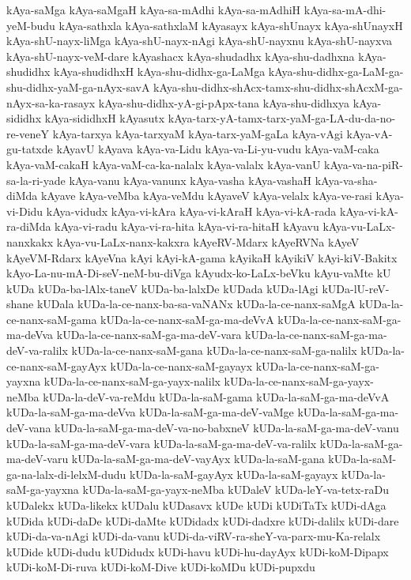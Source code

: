 {kAya-saMga
kAya-saMgaH
kAya-sa-mAdhi
kAya-sa-mAdhiH
kAya-sa-mA-dhi-yeM-budu
kAya-sathxla
kAya-sathxlaM
kAyasayx
kAya-shUnayx
kAya-shUnayxH
kAya-shU-nayx-liMga
kAya-shU-nayx-nAgi
kAya-shU-nayxnu
kAya-shU-nayxva
kAya-shU-nayx-veM-dare
kAyashacx
kAya-shudadhx
kAya-shu-dadhxna
kAya-shudidhx
kAya-shudidhxH
kAya-shu-didhx-ga-LaMga
kAya-shu-didhx-ga-LaM-ga-shu-didhx-yaM-ga-nAyx-savA
kAya-shu-didhx-shAcx-tamx-shu-didhx-shAcxM-ga-nAyx-sa-ka-rasayx
kAya-shu-didhx-yA-gi-pApx-tana
kAya-shu-didhxya
kAya-sididhx
kAya-sididhxH
kAyasutx
kAya-tarx-yA-tamx-tarx-yaM-ga-LA-du-da-no-re-veneY
kAya-tarxya
kAya-tarxyaM
kAya-tarx-yaM-gaLa
kAya-vAgi
kAya-vA-gu-tatxde
kAyavU
kAyava
kAya-va-Lidu
kAya-va-Li-yu-vudu
kAya-vaM-caka
kAya-vaM-cakaH
kAya-vaM-ca-ka-nalalx
kAya-valalx
kAya-vanU
kAya-va-na-piR-sa-la-ri-yade
kAya-vanu
kAya-vanunx
kAya-vasha
kAya-vashaH
kAya-va-sha-diMda
kAyave
kAya-veMba
kAya-veMdu
kAyaveV
kAya-velalx
kAya-ve-rasi
kAya-vi-Didu
kAya-vidudx
kAya-vi-kAra
kAya-vi-kAraH
kAya-vi-kA-rada
kAya-vi-kA-ra-diMda
kAya-vi-radu
kAya-vi-ra-hita
kAya-vi-ra-hitaH
kAyavu
kAya-vu-LaLx-nanxkakx
kAya-vu-LaLx-nanx-kakxra
kAyeRV-Mdarx
kAyeRVNa
kAyeV
kAyeVM-Rdarx
kAyeVna
kAyi
kAyi-kA-gama
kAyikaH
kAyikiV
kAyi-kiV-Bakitx
kAyo-La-nu-mA-Di-seV-neM-bu-diVga
kAyudx-ko-LaLx-beVku
kAyu-vaMte
kU
kUDa
kUDa-ba-lAlx-taneV
kUDa-ba-lalxDe
kUDada
kUDa-lAgi
kUDa-lU-reV-shane
kUDala
kUDa-la-ce-nanx-ba-sa-vaNANx
kUDa-la-ce-nanx-saMgA
kUDa-la-ce-nanx-saM-gama
kUDa-la-ce-nanx-saM-ga-ma-deVvA
kUDa-la-ce-nanx-saM-ga-ma-deVva
kUDa-la-ce-nanx-saM-ga-ma-deV-vara
kUDa-la-ce-nanx-saM-ga-ma-deV-va-ralilx
kUDa-la-ce-nanx-saM-gana
kUDa-la-ce-nanx-saM-ga-nalilx
kUDa-la-ce-nanx-saM-gayAyx
kUDa-la-ce-nanx-saM-gayayx
kUDa-la-ce-nanx-saM-ga-yayxna
kUDa-la-ce-nanx-saM-ga-yayx-nalilx
kUDa-la-ce-nanx-saM-ga-yayx-neMba
kUDa-la-deV-va-reMdu
kUDa-la-saM-gama
kUDa-la-saM-ga-ma-deVvA
kUDa-la-saM-ga-ma-deVva
kUDa-la-saM-ga-ma-deV-vaMge
kUDa-la-saM-ga-ma-deV-vana
kUDa-la-saM-ga-ma-deV-va-no-babxneV
kUDa-la-saM-ga-ma-deV-vanu
kUDa-la-saM-ga-ma-deV-vara
kUDa-la-saM-ga-ma-deV-va-ralilx
kUDa-la-saM-ga-ma-deV-varu
kUDa-la-saM-ga-ma-deV-vayAyx
kUDa-la-saM-gana
kUDa-la-saM-ga-na-lalx-di-lelxM-dudu
kUDa-la-saM-gayAyx
kUDa-la-saM-gayayx
kUDa-la-saM-ga-yayxna
kUDa-la-saM-ga-yayx-neMba
kUDaleV
kUDa-leY-va-tetx-raDu
kUDalekx
kUDa-likekx
kUDalu
kUDasavx
kUDe
kUDi
kUDiTaTx
kUDi-dAga
kUDida
kUDi-daDe
kUDi-daMte
kUDidadx
kUDi-dadxre
kUDi-dalilx
kUDi-dare
kUDi-da-va-nAgi
kUDi-da-vanu
kUDi-da-viRV-ra-sheY-va-parx-mu-Ka-relalx
kUDide
kUDi-dudu
kUDidudx
kUDi-havu
kUDi-hu-dayAyx
kUDi-koM-Dipapx
kUDi-koM-Di-ruva
kUDi-koM-Dive
kUDi-koMDu
kUDi-pupxdu
}

